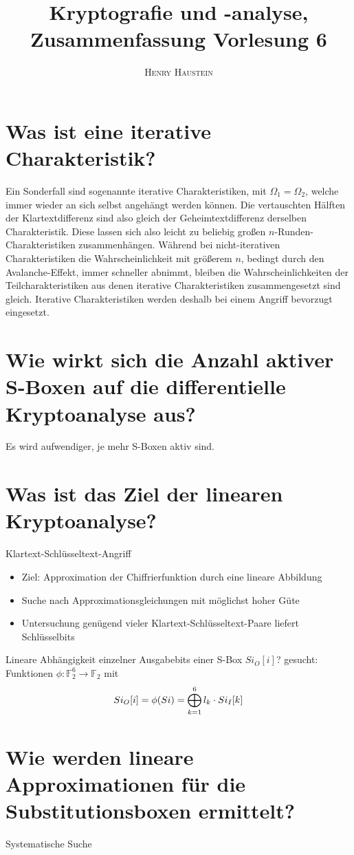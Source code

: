 \documentclass{article}
\title{\textbf{Kryptografie und -analyse, Zusammenfassung Vorlesung 6}}
\author{\textsc{Henry Haustein}}
\date{}
\begin{document}
	\maketitle
	
	\section*{Was ist eine iterative Charakteristik?}
	Ein Sonderfall sind sogenannte iterative Charakteristiken, mit $\Omega_1 = \Omega_2$, welche immer wieder an sich selbst angehängt werden können. Die vertauschten Hälften der Klartextdifferenz sind also gleich der Geheimtextdifferenz derselben Charakteristik. Diese lassen sich also leicht zu beliebig großen $n$-Runden-Charakteristiken zusammenhängen. Während bei nicht-iterativen Charakteristiken die Wahrscheinlichkeit mit größerem $n$, bedingt durch den Avalanche-Effekt, immer schneller abnimmt, bleiben die Wahrscheinlichkeiten der Teilcharakteristiken aus denen iterative Charakteristiken zusammengesetzt sind gleich. Iterative Charakteristiken werden deshalb bei einem Angriff bevorzugt eingesetzt.

	\section*{Wie wirkt sich die Anzahl aktiver S-Boxen auf die differentielle Kryptoanalyse aus?}
	Es wird aufwendiger, je mehr S-Boxen aktiv sind.
	
	\section*{Was ist das Ziel der linearen Kryptoanalyse?}
	Klartext-Schlüsseltext-Angriff
	\begin{itemize}
		\item Ziel: Approximation der Chiffrierfunktion durch eine lineare Abbildung
		\item Suche nach Approximationsgleichungen mit möglichst hoher Güte
		\item Untersuchung genügend vieler Klartext-Schlüsseltext-Paare liefert Schlüsselbits
	\end{itemize}
	Lineare Abhängigkeit einzelner Ausgabebits einer S-Box $Si_{O}[i]$? gesucht: Funktionen $\phi: \mathbb{F}_2^6 \to \mathbb{F}_2$ mit
	\begin{align}
		Si_O[i] = \phi(Si) = \bigoplus_{k=1}^{6} l_k\cdot Si_I[k] \notag
	\end{align}
	
	\section*{Wie werden lineare Approximationen für die Substitutionsboxen ermittelt?}
	Systematische Suche
	
\end{document}
